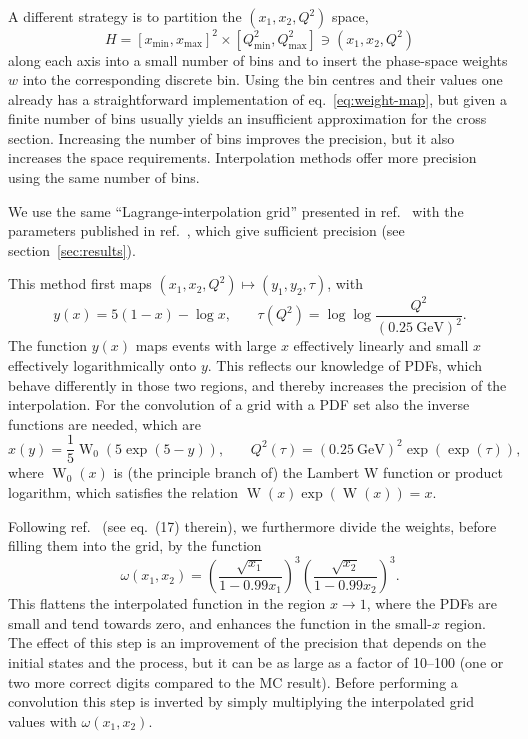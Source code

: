 A different strategy is to partition the $(x_1, x_2, Q^2)$ space,
\begin{equation}
H = [x_\mathrm{min},x_\mathrm{max}]^2 \times [Q^2_\mathrm{min}, Q^2_\mathrm{max}] \ni (x_1, x_2, Q^2)
\end{equation}
along each axis into a small number of bins and to insert the phase-space weights $w$ into the corresponding discrete bin.
Using the bin centres and their values one already has a straightforward implementation of eq.~\eqref{eq:weight-map}, but given a finite number of bins usually yields an insufficient approximation for the cross section.
Increasing the number of bins improves the precision, but it also increases the space requirements.
Interpolation methods offer more precision using the same number of bins.

We use the same \enquote{Lagrange-interpolation grid} presented in ref.~\cite{Carli:2010rw} with the parameters published in ref.~\cite{Bertone:2014zva}, which give sufficient precision (see section~\ref{sec:results}).

This method first maps $(x_1, x_2, Q^2) \mapsto (y_1, y_2, \tau)$, with
\begin{equation}
y(x) = 5 (1-x) - \log x \text{,} \qquad \tau (Q^2) = \log \log \frac{Q^2}{(\SI{0.25}{\giga\electronvolt})^2} \text{.}
\label{eq:maps}
\end{equation}
The function $y(x)$ maps events with large $x$ effectively linearly and small $x$ effectively logarithmically onto $y$.
This reflects our knowledge of PDFs, which behave differently in those two regions, and thereby increases the precision of the interpolation.
For the convolution of a grid with a PDF set also the inverse functions are needed, which are
\begin{equation}
x(y) = \frac{1}{5} \operatorname{W}_0 (5 \exp (5-y)) \text{,} \qquad Q^2 (\tau) = (\SI{0.25}{\giga\electronvolt})^2 \exp (\exp (\tau)) \text{,}
\end{equation}
where $\operatorname{W}_0 (x)$ is (the principle branch of) the Lambert W function or product logarithm, which satisfies the relation $\operatorname{W} (x) \exp (\operatorname{W} (x)) = x$.

Following ref.~\cite{Carli:2010rw} (see eq.~(17) therein), we furthermore divide the weights, before filling them into the grid, by the function
\begin{equation}
\omega (x_1, x_2) = \left( \frac{\sqrt{x_1}}{1 - 0.99 x_1} \right)^3 \left( \frac{\sqrt{x_2}}{1 - 0.99 x_2} \right)^3 \text{.}
\end{equation}
This flattens the interpolated function in the region $x \to 1$, where the PDFs are small and tend towards zero, and enhances the function in the small-$x$ region.
The effect of this step is an improvement of the precision that depends on the initial states and the process, but it can be as large as a factor of \numrange{10}{100} (one or two more correct digits compared to the MC result).
Before performing a convolution this step is inverted by simply multiplying the interpolated grid values with $\omega (x_1, x_2)$.

